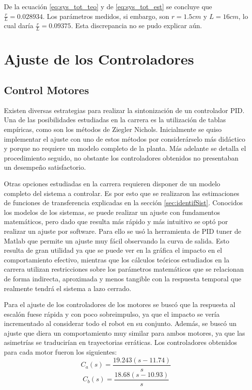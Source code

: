 \documentclass[10pt,conference,a4paper,onecolumn]{article}%
\begin{document}
De la ecuación \ref{eq:sys_tot_teo} y de \ref{eq:sys_tot_est}  se concluye que $\frac{r}{L}=0.028934 $. Los parámetros medidos, si embargo, son $r=1.5cm$ y $L=16cm$, lo cual daría $\frac{r}{L}=0.09375 $. Esta discrepancia no se pudo explicar aún.   

\section{Ajuste de los Controladores} 
\subsection{Control Motores}\label{sec:ajus_control}
Existen diversas estrategias para realizar la sintonización de un controlador PID. Una de las posibilidades estudiadas en la carrera es la utilización de tablas empíricas, como son los métodos de Ziegler Nichols. Inicialmente se quiso implementar el ajuste con uno de estos métodos por considerárselo más didáctico y porque no requiere un modelo completo de la planta. Más adelante se detalla el procedimiento seguido, no obstante los controladores obtenidos no presentaban un desempeño satisfactorio.

Otras opciones estudiadas en la carrera requieren disponer de un modelo completo del sistema a controlar. Es por esto que se realizaron las estimaciones de funciones de transferencia explicadas en la sección \ref{sec:identifSist}. Conocidos los modelos de los sistemas, se puede realizar un ajuste con fundamentos matemáticos, pero dado que resulta más rápido y más intuitivo se optó por realizar un ajuste por software. Para ello se usó la herramienta de PID tuner de Matlab \cite{PID_tuner} que permite un ajuste muy fácil observando la curva de salida. Esto resulta de gran utilidad ya que se puede ver en la gráfica el impacto en el comportamiento efectivo, mientras que los cálculos teóricos estudiados en la carrera utilizan restricciones sobre los parámetros matemáticos que se relacionan de forma indirecta, aproximada y menos tangible con la respuesta temporal que realmente tendrá el sistema a lazo cerrado.

Para el ajuste de los controladores de los motores se buscó que la respuesta al escalón fuese rápida y con poco sobreimpulso, ya que el impacto se vería incrementado al considerar todo el robot en su conjunto. Además, se buscó un ajuste que diera un comportamiento muy similar para ambos motores, ya que las asimetrías se traducirían en trayectorias erráticas. Los controladores obtenidos para cada motor fueron los siguientes:
\begin{equation*}
C_a(s)= \frac{  19.243 (s-11.74)}{s}
\end{equation*}
\begin{equation*}
C_b(s)= \frac{ 18.68 (s-10.93)}{s}
\end{equation*}
\end{document}

